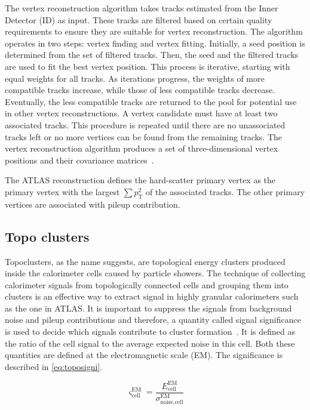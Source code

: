 The vertex reconstruction algorithm takes tracks estimated from the Inner Detector (ID) as input. These tracks are filtered based on certain quality requirements to ensure 
they are suitable for vertex reconstruction. The algorithm operates in two steps: vertex finding and vertex fitting. Initially, a seed position is determined from the set of 
filtered tracks. Then, the seed and the filtered tracks are used to fit the best vertex position. This process is iterative, starting with equal weights for all tracks. As iterations 
progress, the weights of more compatible tracks increase, while those of less compatible tracks decrease. Eventually, the less compatible tracks are returned to the pool for potential 
use in other vertex reconstructions. A vertex candidate must have at least two associated tracks. This procedure is repeated until there are no unassociated tracks left or no more 
vertices can be found from the remaining tracks. The vertex reconstruction algorithm produces a set of three-dimensional vertex positions and their covariance 
matrices~\cite{F_Meloni_vertex}.

The ATLAS reconstruction defines the hard-scatter primary vertex as the primary vertex with the
largest $\sum p_{\text{T}}^2$ of the associated tracks. The other primary vertices are associated
with pileup contribution. 

\subsection{Topo clusters}
Topoclusters, as the name suggests, are topological energy clusters produced inside the calorimeter cells caused by particle showers. 
The technique of collecting calorimeter signals from topologically connected cells and grouping them into clusters is an effective way to extract signal in 
highly granular calorimeters such as the one in ATLAS. It is important to suppress the signals from background noise and pileup contributions and therefore, 
a quantity called signal significance is used to decide which signals contribute to cluster formation~\cite{Aad:2138166}. It is defined as the ratio of the cell signal to the average 
expected noise in this cell. Both these quantities are defined at the electromagnetic scale (EM). The significance is described in \cref{eq:toposigni}.

\begin{equation}
    \varsigma_{\text{cell}}^{\text{EM}} = \frac{E_{\text{cell}}^{\text{EM}}}{\sigma_{\text{noise,cell}}^{\text{EM}}}
    \label{eq:toposigni}
\end{equation}

